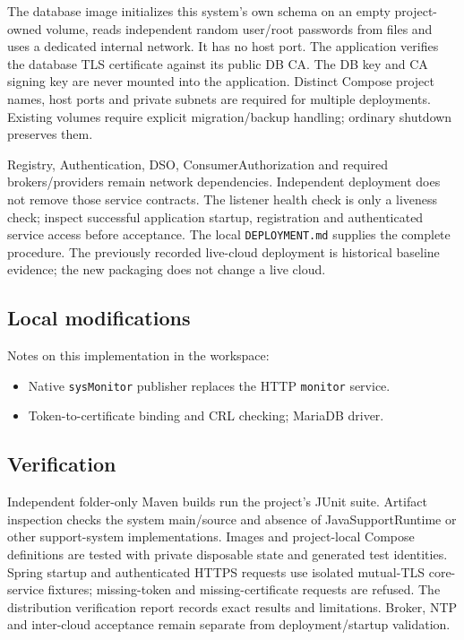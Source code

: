 \documentclass[a4paper]{arrowhead}
\begin{document}
The database image initializes this system's own schema on an empty project-owned volume, reads independent random user/root passwords from files and uses a dedicated internal network. It has no host port. The application verifies the database TLS certificate against its public DB CA. The DB key and CA signing key are never mounted into the application. Distinct Compose project names, host ports and private subnets are required for multiple deployments. Existing volumes require explicit migration/backup handling; ordinary shutdown preserves them.

Registry, Authentication, DSO, ConsumerAuthorization and required brokers/providers remain network dependencies. Independent deployment does not remove those service contracts. The listener health check is only a liveness check; inspect successful application startup, registration and authenticated service access before acceptance. The local \texttt{DEPLOYMENT.md} supplies the complete procedure. The previously recorded live-cloud deployment is historical baseline evidence; the new packaging does not change a live cloud.

\subsection{Local modifications}
\label{sec:local}

Notes on this implementation in the workspace:
\begin{itemize}
  \item Native \texttt{sysMonitor} publisher replaces the HTTP \texttt{monitor} service.
  \item Token-to-certificate binding and CRL checking; MariaDB driver.
\end{itemize}

\subsection{Verification}

Independent folder-only Maven builds run the project's JUnit suite. Artifact inspection checks the system main/source and absence of JavaSupportRuntime or other support-system implementations. Images and project-local Compose definitions are tested with private disposable state and generated test identities. Spring startup and authenticated HTTPS requests use isolated mutual-TLS core-service fixtures; missing-token and missing-certificate requests are refused. The distribution verification report records exact results and limitations. Broker, NTP and inter-cloud acceptance remain separate from deployment/startup validation.
\end{document}
